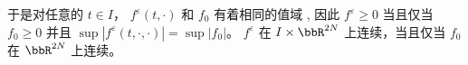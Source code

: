 \begin{lemma}
\begin{enumerate}[(i)]
    于是对任意的 $t \in I$， $f^{\varepsilon}(t, \cdot)$ 和 $f_{0}$ 有着相同的值域 , 因此 $f^{\varepsilon} \geqslant 0$ 当且仅当 $f_{0} \geqslant 0$ 并且 $\sup \left|f^{\varepsilon}(t, \cdot,\cdot)\right|=\sup |f_{0}|$。 $f^{\varepsilon}$ 在 $I \times \bbR^{2N}$ 上连续，当且仅当 $f_{0}$ 在 $\bbR^{2N}$ 上连续。%



\end{enumerate}
\end{lemma}
